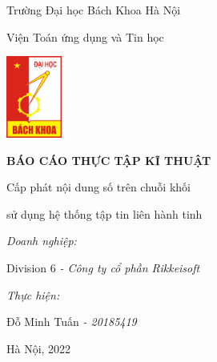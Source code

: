 \begin{titlepage}
    \centering
    \vspace{0.25cm}
    {\large Trường Đại học Bách Khoa Hà Nội\par}
    \vspace{0.25cm}
    {\normalsize Viện Toán ứng dụng và Tin học\par}
    \vspace{0.75cm}
    {\includegraphics[width=69px]{anh/hust-logo.png}\par}
    \vspace{1.25cm}
    {\Large\textbf{BÁO CÁO THỰC TẬP KĨ THUẬT}\par}
    \vspace{1.5cm}
    {\large Cấp phát nội dung số trên chuỗi khối\par}
    \vspace{0.25cm}
    {\large sử dụng hệ thống tập tin liên hành tinh\par}
    \vspace{1.5cm}
    \begin{flushleft}
        \hspace{3cm}
        {\normalsize\textit{Doanh nghiệp:}\par}
        \vspace{0.125cm}
        \hspace{5cm}
        {\normalsize Division 6 \textit{- Công ty cổ phần Rikkeisoft}\par}
        \vspace{0.125cm}
        \hspace{3cm}
        {\normalsize\textit{Thực hiện:}\par}
        \vspace{0.125cm}
        \hspace{5cm}
        {\normalsize Đỗ Minh Tuấn \textit{- 20185419}\par}
    \end{flushleft}
    \vspace{3cm}
    {\normalsize Hà Nội, 2022\par}
    \vspace{0.5cm}
\end{titlepage}